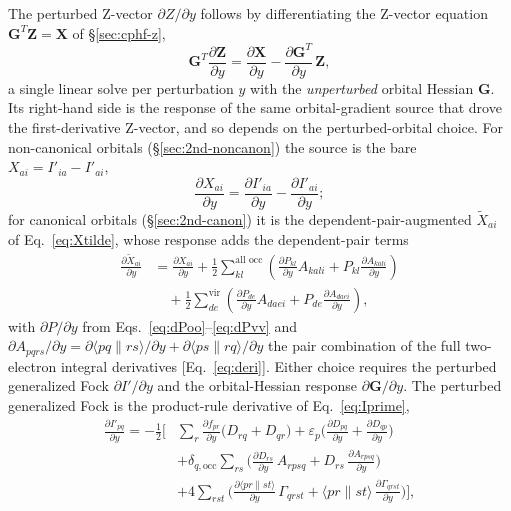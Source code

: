 \documentclass[12pt]{article}
\newcommand{\adb}[2]{\langle #1 \| #2 \rangle}
\newcommand{\occ}{\text{occ}}
\newcommand{\vir}{\text{vir}}
\newcommand{\alloc}{\text{all occ}}   %
\begin{document}
The perturbed Z-vector $\partial Z/\partial y$ follows by differentiating the
Z-vector equation $\mathbf{G}^{T}\mathbf{Z}=\mathbf{X}$ of \S\ref{sec:cphf-z},
\begin{equation}
\mathbf{G}^{T}\frac{\partial\mathbf{Z}}{\partial y}
= \frac{\partial\mathbf{X}}{\partial y} - \frac{\partial\mathbf{G}^{T}}{\partial y}\,\mathbf{Z},
\label{eq:perturbed-zvector}
\end{equation}
a single linear solve per perturbation $y$ with the {\em unperturbed} orbital
Hessian $\mathbf{G}$.  Its right-hand side is the response of the same
orbital-gradient source that drove the first-derivative Z-vector, and so depends
on the perturbed-orbital choice.  For non-canonical orbitals
(\S\ref{sec:2nd-noncanon}) the source is the bare $X_{ai}=I'_{ia}-I'_{ai}$,
\begin{equation}
\frac{\partial X_{ai}}{\partial y}
= \frac{\partial I'_{ia}}{\partial y}-\frac{\partial I'_{ai}}{\partial y};
\label{eq:dX-noncanon}
\end{equation}
for canonical orbitals (\S\ref{sec:2nd-canon}) it is the dependent-pair-augmented
$\tilde X_{ai}$ of Eq.~\eqref{eq:Xtilde}, whose response adds the dependent-pair
terms
\begin{align}
\frac{\partial\tilde X_{ai}}{\partial y}
&= \frac{\partial X_{ai}}{\partial y}
+ \tfrac12\sum_{kl}^{\alloc}\left(\frac{\partial P_{kl}}{\partial y}A_{kali}
   + P_{kl}\frac{\partial A_{kali}}{\partial y}\right)
\nonumber\\
&\quad
+ \tfrac12\sum_{de}^{\vir}\left(\frac{\partial P_{de}}{\partial y}A_{daei}
   + P_{de}\frac{\partial A_{daei}}{\partial y}\right),
\label{eq:dXtilde}
\end{align}
with $\partial P/\partial y$ from Eqs.~\eqref{eq:dPoo}--\eqref{eq:dPvv} and
$\partial A_{pqrs}/\partial y=\partial\adb{pq}{rs}/\partial y
+\partial\adb{ps}{rq}/\partial y$ the pair combination of the full two-electron
integral derivatives [Eq.~\eqref{eq:deri}].  Either choice requires the perturbed
generalized Fock $\partial I'/\partial y$ and the orbital-Hessian response
$\partial\mathbf{G}/\partial y$.  The perturbed
generalized Fock is the product-rule derivative of Eq.~\eqref{eq:Iprime},
\begin{align}
\frac{\partial I'_{pq}}{\partial y} = -\tfrac12\Big[
&\sum_r\frac{\partial f_{pr}}{\partial y}\big(D_{rq}+D_{qr}\big)
+ \varepsilon_p\Big(\frac{\partial D_{pq}}{\partial y}+\frac{\partial D_{qp}}{\partial y}\Big)
\nonumber\\
&+ \delta_{q,\occ}\sum_{rs}\Big(\frac{\partial D_{rs}}{\partial y}\,A_{rpsq}
   + D_{rs}\,\frac{\partial A_{rpsq}}{\partial y}\Big)
\nonumber\\
&+ 4\sum_{rst}\Big(\frac{\partial\adb{pr}{st}}{\partial y}\,\Gamma_{qrst}
   + \adb{pr}{st}\,\frac{\partial\Gamma_{qrst}}{\partial y}\Big)\Big],
\label{eq:dIprime}
\end{align}
\end{document}
